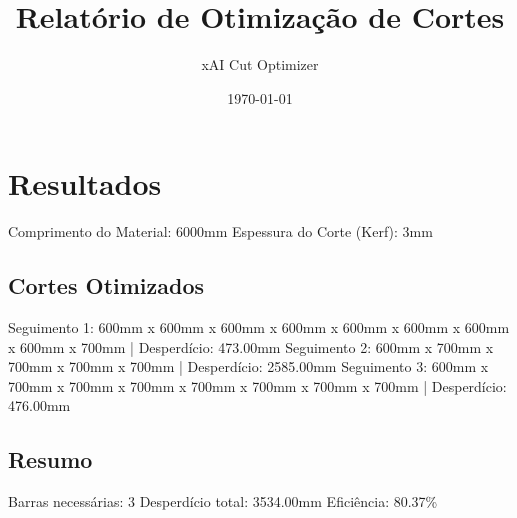 \documentclass{article}%
\title{Relatório de Otimização de Cortes}%
\author{xAI Cut Optimizer}%
\date{\today}%
\begin{document}
%
\normalsize%
\maketitle%
\section{Resultados}%
\label{sec:Resultados}%
Comprimento do Material: 6000mm\newline%
%
Espessura do Corte (Kerf): 3mm\newline%
%
\subsection{Cortes Otimizados}%
\label{subsec:CortesOtimizados}%
Seguimento 1: 600mm x 600mm x 600mm x 600mm x 600mm x 600mm x 600mm x 600mm x 700mm | Desperdício: 473.00mm\newline%
%
Seguimento 2: 600mm x 700mm x 700mm x 700mm x 700mm | Desperdício: 2585.00mm\newline%
%
Seguimento 3: 600mm x 700mm x 700mm x 700mm x 700mm x 700mm x 700mm x 700mm | Desperdício: 476.00mm\newline%

%
\subsection{Resumo}%
\label{subsec:Resumo}%
Barras necessárias: 3\newline%
%
Desperdício total: 3534.00mm\newline%
%
Eficiência: 80.37\%

%
\end{document}

